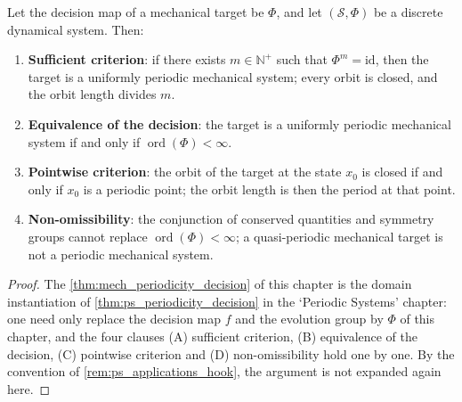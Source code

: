 \begin{theorem}\label{thm:mech_periodicity_decision}
Let the decision map of a mechanical target be $\Phi$, and let $(\mathcal S,\Phi)$ be a discrete dynamical system. Then:
\begin{enumerate}[label=(\Alph*)]
    \item \textbf{Sufficient criterion}: if there exists $m\in\mathbb N^+$ such that $\Phi^m=\mathrm{id}$, then the target is a uniformly periodic mechanical system; every orbit is closed, and the orbit length divides $m$.
    \item \textbf{Equivalence of the decision}: the target is a uniformly periodic mechanical system if and only if $\operatorname{ord}(\Phi)<\infty$.
    \item \textbf{Pointwise criterion}: the orbit of the target at the state $x_0$ is closed if and only if $x_0$ is a periodic point; the orbit length is then the period at that point.
    \item \textbf{Non-omissibility}: the conjunction of conserved quantities and symmetry groups cannot replace $\operatorname{ord}(\Phi)<\infty$; a quasi-periodic mechanical target is not a periodic mechanical system.
\end{enumerate}
\end{theorem}

\begin{proof}
The \cref{thm:mech_periodicity_decision} of this chapter is the domain instantiation of \cref{thm:ps_periodicity_decision} in the `Periodic Systems' chapter:
one need only replace the decision map $f$ and the evolution group by $\Phi$ of this chapter, and the four clauses (A) sufficient criterion, (B) equivalence of the decision, (C) pointwise criterion and
(D) non-omissibility hold one by one. By the convention of \cref{rem:ps_applications_hook}, the argument is not expanded again here.
\end{proof}

